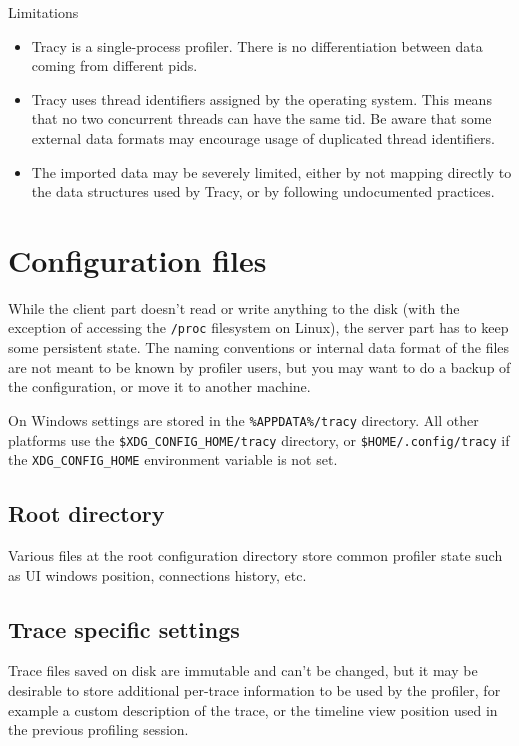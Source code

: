 \documentclass[hidelinks,titlepage,a4paper]{article}
\begin{document}
\begin{bclogo}[
noborder=true,
couleur=black!5,
logo=\bcattention
]{Limitations}
\begin{itemize}
\item Tracy is a single-process profiler. There is no differentiation between data coming from different pids.
\item Tracy uses thread identifiers assigned by the operating system. This means that no two concurrent threads can have the same tid. Be aware that some external data formats may encourage usage of duplicated thread identifiers.
\item The imported data may be severely limited, either by not mapping directly to the data structures used by Tracy, or by following undocumented practices.
\end{itemize}
\end{bclogo}

\section{Configuration files}

While the client part doesn't read or write anything to the disk (with the exception of accessing the \texttt{/proc} filesystem on Linux), the server part has to keep some persistent state. The naming conventions or internal data format of the files are not meant to be known by profiler users, but you may want to do a backup of the configuration, or move it to another machine.

On Windows settings are stored in the \texttt{\%APPDATA\%/tracy} directory. All other platforms use the \texttt{\$XDG\_CONFIG\_HOME/tracy} directory, or \texttt{\$HOME/.config/tracy} if the \texttt{XDG\_CONFIG\_HOME} environment variable is not set.

\subsection{Root directory}

Various files at the root configuration directory store common profiler state such as UI windows position, connections history, etc.

\subsection{Trace specific settings}
\label{tracespecific}

Trace files saved on disk are immutable and can't be changed, but it may be desirable to store additional per-trace information to be used by the profiler, for example a custom description of the trace, or the timeline view position used in the previous profiling session.
\end{document}
